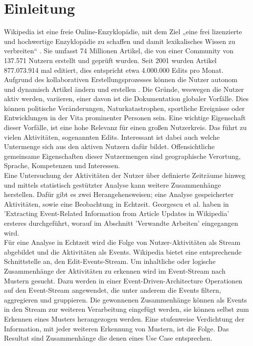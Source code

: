 \section{Einleitung}\label{sec:Einleitung}
Wikipedia ist eine freie Online-Enzyklopädie, mit dem Ziel „eine frei lizenzierte und hochwertige Enzyklopädie zu schaffen und damit lexikalisches Wissen zu verbreiten“ \cite{wales.}. Sie umfasst 74 Millionen Artikel, die von einer Community von 137.571 Nutzern erstellt und geprüft wurden. Seit 2001 wurden Artikel 877.073.914 mal editiert, dies entspricht etwa 4.000.000 Edits pro Monat. \cite{wikistat}\\

Aufgrund des kollaborativen Erstellungsprozesses können die Nutzer autonom und dynamisch Artikel ändern und erstellen \cite{wikipedia.}.
Die Gründe, weswegen die Nutzer aktiv werden, variieren, einer davon ist die Dokumentation globaler Vorfälle. Dies können politische Veränderungen, Naturkatastrophen, sportliche Ereignisse oder Entwicklungen in der Vita prominenter Personen sein. Eine wichtige Eigenschaft dieser Vorfälle, ist eine hohe Relevanz für einen großen Nutzerkreis. Das führt zu vielen Aktivitäten, sogenannten Edits. Interessant ist dabei auch welche Untermenge sich aus den aktiven Nutzern dafür bildet. Offensichtliche gemeinsame Eigenschaften dieser Nutzermengen sind geographische Verortung, Sprache, Kompetenzen und Interessen. \cite{10.1007978-3-642-36973-5_22}\\

Eine Untersuchung der Aktivitäten der Nutzer über definierte Zeiträume hinweg und mittels statistisch gestützter Analyse kann weitere Zusammenhänge herstellen. Dafür gibt es zwei Herangehensweisen; eine Analyse gespeicherter Aktivitäten, sowie eine Beobachtung in Echtzeit. Georgescu et al. \cite{10.1007978-3-642-36973-5_22} haben in 'Extracting Event-Related Information from Article Updates in Wikipedia' ersteres durchgeführt, worauf im Abschnitt 'Verwandte Arbeiten' eingegangen wird. \\

Für eine Analyse in Echtzeit wird die Folge von Nutzer-Aktivitäten als Stream abgebildet und die Aktivitäten als Events. Wikipedia bietet eine entsprechende Schnittstelle an, den Edit-Events-Stream. Um inhaltliche oder logische Zusammenhänge der Aktivitäten zu erkennen wird im Event-Stream nach Mustern gesucht. Dazu werden in einer Event-Driven-Architecture Operationen auf den Event-Stream angewendet, die unter anderem die Events filtern, aggregieren und gruppieren. Die gewonnenen Zusammenhänge können als Events in den Stream zur weiteren Verarbeitung eingefügt werden, sie können selbst zum Erkennen eines Musters herangezogen werden. Eine stufenweise Verdichtung der Information, mit jeder weiteren Erkennung von Mustern, ist die Folge. Das Resultat sind Zusammenhänge die denen eines Use Case entsprechen.

